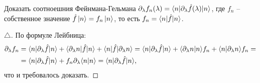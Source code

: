 
\begin{leftrules}
Доказать соотноешния Фейнмана-Гельмана $\partial_\lambda f_n (\lambda) = \bk{n}[\partial_\lambda \hat{f} (\lambda)]{n}$, где $f_n$ -- собственное значение $\hat{f} \left| n \right\rangle = f_n \left| n \right\rangle$, то есть $f_n = \bk{n}[\hat{f}]{n}$. 
\end{leftrules}

\begin{proof}[$\triangle$]


По формуле Лейбница:
\begin{align*}
    \partial_\lambda f_n 
    &= 
    \bk{n}[\partial_\lambda \hat{f}]{n} + 
    \bk{\partial_\lambda n}[\hat{f}]{n} + \bk{n}[\hat{f}]{\partial_\lambda n} 
    =
    \bk{n}[\partial_\lambda \hat{f}]{n} + \bk{\partial_\lambda n}{n} f_n + 
    \bk{n}{\partial_\lambda n} f_n 
    = \\ &=
    \bk{n}[\partial_\lambda \hat{f}]{n} + f_n \partial_\lambda \bk{n}{n} 
    = 
    \bk{n}[\partial_\lambda \hat{f}]{n},
\end{align*}
что и требовалось доказать.

\end{proof}
